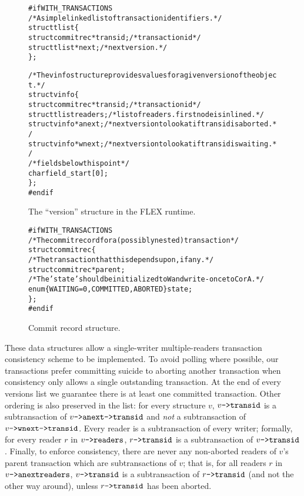\documentclass[11pt,notitlepage]{article}
\newcommand{\ptr}{\code{->}}
\newcommand{\codesize}{\scriptsize}
\begin{document}
\begin{figure}
\begin{alltt}\codesize
#if WITH_TRANSACTIONS
/* A simple linked list of transaction identifiers. */
struct tlist \{
  struct commitrec *transid; /* transaction id */ 
  struct tlist *next; /* next version. */
\};

/* The vinfo structure provides values for a given version of the object. */
struct vinfo \{
  struct commitrec *transid; /* transaction id */ 
  struct tlist readers; /* list of readers.  first node is inlined. */
  struct vinfo *anext; /* next version to look at if transid is aborted. */
  struct vinfo *wnext; /* next version to look at if transid is waiting. */
  /* fields below this point */
  char field_start[0];
\};
#endif
\end{alltt}
\caption{The ``version'' structure in the FLEX runtime.}
\label{fig:version}
\end{figure}

\begin{figure}
\begin{alltt}\codesize
#if WITH_TRANSACTIONS
/* The commit record for a (possibly nested) transaction */
struct commitrec \{
  /* The transaction that this depends upon, if any. */
  struct commitrec *parent;
  /* The 'state' should be initialized to W and write-once to C or A. */
  enum \{ WAITING=0, COMMITTED, ABORTED \} state;
\};
#endif
\end{alltt}
\caption{Commit record structure.}
\label{fig:commitrec}
\end{figure}

These data structures allow a single-writer multiple-readers
transaction consistency scheme to be implemented.  To avoid polling
where possible, our transactions prefer committing suicide to aborting
another transaction when consistency only allows a single outstanding
transaction.  At the end of every versions list we guarantee there is
at least one committed transaction.  Other ordering is also preserved
in the list: for every  structure $v$,
$v\ptr\code{transid}$ is a subtransaction of
$v\ptr\code{anext}\ptr\code{transid}$ and \emph{not} a subtransaction of
$v\ptr\code{wnext}\ptr\code{transid}$.  Every reader is a
subtransaction of every writer; formally, for every reader $r$ in
$v\ptr\code{readers}$, $r\ptr\code{transid}$ is a subtransaction of
$v\ptr\code{transid}$.  Finally, to enforce consistency, there are
never any non-aborted readers of $v$'s parent transaction which are
subtransactions of $v$; that is, for all readers $r$ in
$v\ptr\code{anext}\code{readers}$, $v\ptr\code{transid}$ is a
subtransaction of $r\ptr\code{transid}$ (and not the other way
around), unless $r\ptr\code{transid}$ has been aborted.
\end{document}
